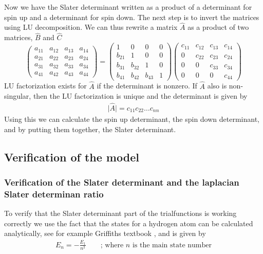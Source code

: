 \documentclass[11pt]{article}
\begin{document}
		Now we have the Slater determinant written as a product of a determinant
		for spin up and a determinant for spin down. The next step is to invert
		the matrices using LU decomposition. We can thus rewrite a matrix
		$\hat{A}$ as a product of two matrices, $\hat{B}$ and $\hat{C}$
		\[
		\left(\begin{array}{cccc}
		a_{11} & a_{12} & a_{13} & a_{14}\\
		a_{21} & a_{22} & a_{23} & a_{24}\\
		a_{31} & a_{32} & a_{33} & a_{34}\\
		a_{41} & a_{42} & a_{43} & a_{44}
		\end{array}\right)=\left(\begin{array}{cccc}
		1 & 0 & 0 & 0\\
		b_{21} & 1 & 0 & 0\\
		b_{31} & b_{32} & 1 & 0\\
		b_{41} & b_{42} & b_{43} & 1
		\end{array}\right)\left(\begin{array}{cccc}
		c_{11} & c_{12} & c_{13} & c_{14}\\
		0 & c_{22} & c_{23} & c_{24}\\
		0 & 0 & c_{33} & c_{34}\\
		0 & 0 & 0 & c_{44}
		\end{array}\right)
		\]
		LU factorization exists for $\hat{A}$ if the determinant is nonzero.
		If $\hat{A}$ also is non-singular, then the LU factorization is unique
		and the determinant is given by
		\begin{align}
			\vert\hat{A}\vert=c_{11}c_{22}\dots c_{nn}
		\end{align}
		Using this we can calculate the spin up determinant, the spin down
		determinant, and by putting them together, the Slater determinant.

	\subsection{Verification of the model}

		\subsubsection{Verification of the Slater determinant and the laplacian Slater determinan ratio}
			To verify that the Slater determinant part of the trialfunctions is working correctly we use the fact that the states for a hydrogen atom can be calculated analytically, see for example Griffiths textbook  \cite{griffiths2005introduction}, and is given by
			\begin{align}
				E_n = -\frac{E_1}{n^2}  \qquad \text{; where } n  \text{ is the main state number}
			\end{align}
\end{document}
